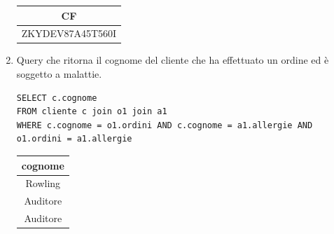 \documentclass[10pt]{article}
\begin{document}
\begin{enumerate}[noitemsep]
\begin{center}
	\begin{table}[H]
		\centering
		\label{table:query2}
		\begin{tabular}{|c|}
			\hline
			\textbf{CF} \\ \hline
			ZKYDEV87A45T560I \\ \hline
		\end{tabular}
	\end{table}
\end{center}
	\item Query che ritorna il cognome del cliente che ha effettuato un ordine ed è soggetto a malattie.
	\begin{lstlisting}[style=Mysql]
SELECT c.cognome 
FROM cliente c join o1 join a1 
WHERE c.cognome = o1.ordini AND c.cognome = a1.allergie AND o1.ordini = a1.allergie
	\end{lstlisting}
	\begin{table}[H]
		\centering
		\label{table:query5}
		\begin{tabular}{|c|}
			\hline
			\textbf{cognome} \\ \hline
			Rowling          \\ \hline
			Auditore          \\	\hline
			Auditore          \\	\hline
		\end{tabular}
	\end{table}


\end{enumerate}
\end{document}
